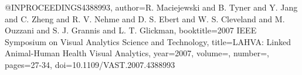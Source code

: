 @INPROCEEDINGS{4388993,
  author={R. {Maciejewski} and B. {Tyner} and Y. {Jang} and C. {Zheng} and R. V. {Nehme} and D. S. {Ebert} and W. S. {Cleveland} and M. {Ouzzani} and S. J. {Grannis} and L. T. {Glickman}},
  booktitle={2007 IEEE Symposium on Visual Analytics Science and Technology}, 
  title={LAHVA: Linked Animal-Human Health Visual Analytics}, 
  year={2007},
  volume={},
  number={},
  pages={27-34},
  doi={10.1109/VAST.2007.4388993}}